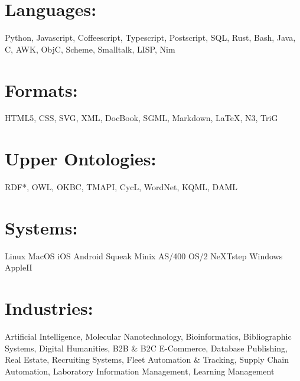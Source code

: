 \documentclass[line,margin,hidelinks]{res}
\begin{document}
\begin{resume}
\section{Languages:}
\begin{par}
  Python, Javascript, Coffeescript, Typescript, Postscript, SQL, Rust, Bash,
  Java, C, AWK, ObjC, Scheme, Smalltalk, LISP, Nim
\end{par}

\section{Formats:}
\begin{par}
  HTML5, CSS, SVG, XML, DocBook, SGML, Markdown, \LaTeX, N3, TriG
\end{par}

\section{\footnotesize{Upper Ontologies:}}
\begin{par}
  RDF*, OWL, OKBC, TMAPI, CycL, WordNet, KQML, DAML
\end{par}


% 


\section{Systems:}
\begin{par}
Linux MacOS iOS Android Squeak Minix AS/400 OS/2 NeXTstep Windows AppleII
\end{par}

\section{Industries:}
\begin{par}
Artificial Intelligence,
Molecular Nanotechnology,
Bioinformatics,
Bibliographic Systems,
Digital Humanities,
B2B \& B2C E-Commerce,
Database Publishing,
Real Estate,
Recruiting Systems,
Fleet Automation \& Tracking,
Supply Chain Automation,
Laboratory Information Management,
Learning Management
\end{par}


\end{resume}
\end{document}
